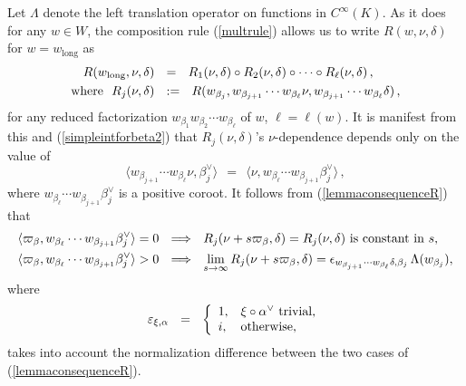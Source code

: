 \documentclass[12pt]{article}
\numberwithin{equation}{section}
\renewcommand\a{\alpha}
\renewcommand\b{\beta}
\renewcommand\d{\delta}
\newcommand\e{\varepsilon}
\renewcommand\({\left(}
\renewcommand\){\right)}
\begin{document}
Let $\Lambda$ denote the left translation operator on functions in $C^\infty(K)$.  As it does for any $w\in W$, the composition rule (\ref{multrule}) allows us to write $R(w,\nu,\delta)$ for $w=w_\text{long}$ as
\begin{equation}\label{comprulelong}
\aligned
  R(w_{\text{long}},\nu,\delta) \ \ & = \ \ R_1(\nu,\delta)\circ R_2(\nu,\delta)\circ\cdots\circ R_{\ell}(\nu,\delta)\,,\\
\text{where} \ \ R_j(\nu,\delta) \ \ & := \ \ R(w_{\b_j},w_{\b_{j+1}}\cdots w_{\b_\ell}\nu,w_{\b_{j+1}}\cdots w_{\b_\ell} \d)
\,,
\endaligned
\end{equation}
for any reduced factorization $w_{\beta_1}w_{\beta_2}\cdots w_{\b_\ell}$ of $w$, $\ell=\ell(w)$.  It is manifest from  this and (\ref{simpleintforbeta2}) that  $R_j(\nu,\delta)$'s $\nu$-dependence depends only on the value of
\begin{equation}\label{factorsthrough}
\langle w_{\b_{j+1}}\cdots w_{\b_\ell}\nu,\beta_j^\vee\rangle \ \ = \ \
\langle \nu,w_{\b_\ell}\cdots w_{\b_{j+1}} \beta_j^\vee\rangle\,,
\end{equation}
where $w_{\b_\ell}\cdots w_{\b_{j+1}} \beta_j^\vee$ is a positive coroot.
It follows from (\ref{lemmaconsequenceR}) that
\begin{equation}\label{vanishingimplication}
\aligned
 \langle \varpi_\beta,w_{\b_\ell}\cdots w_{\b_{j+1}} \beta_j^\vee \rangle = 0 \ \ & \Longrightarrow \ \
R_j(\nu+s\varpi_\beta,\d)=R_j(\nu,\d) \text{~is constant in $s$,}\\
 \langle \varpi_\beta,w_{\b_\ell}\cdots w_{\b_{j+1}} \beta_j^\vee \rangle > 0 \ \ & \Longrightarrow \ \
 \lim_{s\rightarrow\infty} R_j(\nu+s\varpi_\beta, \d) = \epsilon_{w_{\beta_{j+1}}\cdots w_{\b_\ell}\d,\beta_j} \,\Lambda(w_{\beta_j}),
\endaligned
\end{equation}
where
\begin{equation}\label{epsilonfactor}
  \e_{\xi,\a} \ \ = \ \ \left\{
                                \begin{array}{ll}
                                  1, & \xi\circ\a^\vee\ \text{trivial,} \\
                                  i, & \hbox{otherwise,}
                                \end{array}
                              \right.
\end{equation}
takes into account  the normalization difference between the two cases of (\ref{lemmaconsequenceR}).
\end{document}

